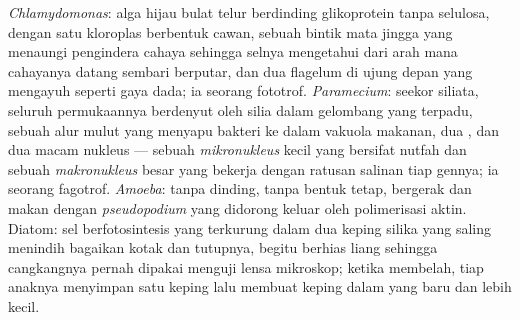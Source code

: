 \begin{example}\label{ex:b2:unicellular-diversity:four}
\emph{Chlamydomonas}: alga hijau bulat telur berdinding glikoprotein
tanpa selulosa, dengan satu kloroplas berbentuk cawan, sebuah bintik
mata jingga yang menaungi pengindera cahaya sehingga selnya mengetahui
dari arah mana cahayanya datang sembari berputar, dan dua flagelum di
ujung depan yang mengayuh seperti gaya dada; ia seorang fototrof.
\emph{Paramecium}: seekor siliata, seluruh permukaannya berdenyut oleh
silia dalam gelombang yang terpadu, sebuah alur mulut yang menyapu
bakteri ke dalam vakuola makanan, dua , dan dua macam
nukleus --- sebuah \emph{mikronukleus} kecil yang bersifat nutfah dan
sebuah \emph{makronukleus} besar yang bekerja dengan ratusan salinan
tiap gennya; ia seorang fagotrof. \emph{Amoeba}: tanpa dinding, tanpa
bentuk tetap, bergerak dan makan dengan \emph{pseudopodium} yang
didorong keluar oleh polimerisasi aktin. Diatom: sel berfotosintesis
yang terkurung dalam dua keping silika yang saling menindih bagaikan
kotak dan tutupnya, begitu berhias liang sehingga cangkangnya pernah
dipakai menguji lensa mikroskop; ketika membelah, tiap anaknya menyimpan
satu keping lalu membuat keping dalam yang baru dan lebih kecil.
\end{example}

